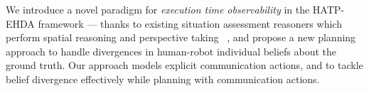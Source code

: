 \documentclass[letterpaper]{article} %
\begin{document}


We introduce a novel paradigm for {\em execution time observability} in the HATP-EHDA framework --- thanks to existing situation  assessment reasoners which perform spatial reasoning and perspective taking ~\cite{flavell1992perspectives,trafton2005enabling,johnson2005perceptual,Sisbot2011SituationAF}, and propose a new planning approach 
to handle divergences in human-robot individual beliefs about the ground truth.
Our approach models explicit communication actions, and to tackle belief divergence effectively while planning with communication actions.

\end{document}
